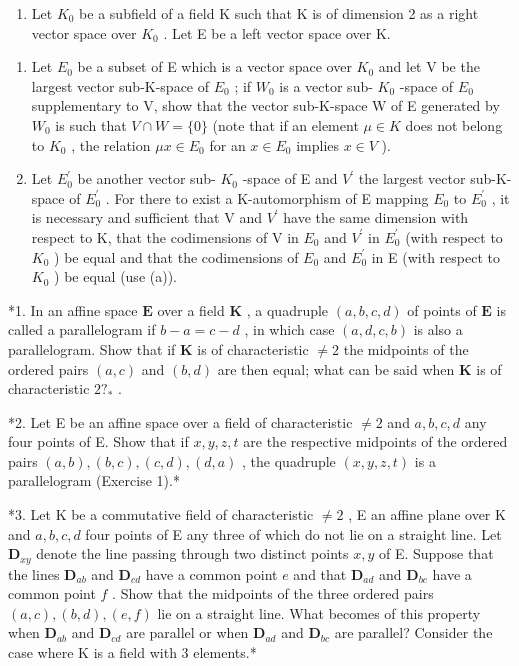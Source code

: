 \begin{enumerate}
\def\labelenumi{\arabic{enumi}.}
\setcounter{enumi}{4}
\tightlist
\item
  Let \(K_{0}\) be a subfield of a field K such that K is of dimension 2 as a right vector space over \(K_{0}\) . Let E be a left vector space over K.
\end{enumerate}

\begin{enumerate}
\def\labelenumi{(\alph{enumi})}
\item
  Let \(E_{0}\) be a subset of E which is a vector space over \(K_{0}\) and let V be the largest vector sub-K-space of \(E_{0}\) ; if \(W_{0}\) is a vector sub- \(K_{0}\) -space of \(E_{0}\) supplementary to V, show that the vector sub-K-space W of E generated by \(W_{0}\) is such that \(V \cap W = \{0\}\) (note that if an element \(\mu \in K\) does not belong to \(K_{0}\) , the relation \(\mu x \in E_{0}\) for an \(x \in E_{0}\) implies \(x \in V\) ).
\item
  Let \(E_{0}^{\prime}\) be another vector sub- \(K_{0}\) -space of E and \(V^{\prime}\) the largest vector sub-K-space of \(E_{0}^{\prime}\) . For there to exist a K-automorphism of E mapping \(E_{0}\) to \(E_{0}^{\prime}\) , it is necessary and sufficient that V and \(V^{\prime}\) have the same dimension with respect to K, that the codimensions of V in \(E_{0}\) and \(V^{\prime}\) in \(E_{0}^{\prime}\) (with respect to \(K_{0}\) ) be equal and that the codimensions of \(E_{0}\) and \(E_{0}^{\prime}\) in E (with respect to \(K_{0}\) ) be equal (use (a)).
\end{enumerate}

\BourbakiExercisesSection

*1. In an affine space \(\mathbf{E}\) over a field \(\mathbf{K}\) , a quadruple \((a, b, c, d)\) of points of \(\mathbf{E}\) is called a parallelogram if \(b - a = c - d\) , in which case \((a, d, c, b)\) is also a parallelogram. Show that if \(\mathbf{K}\) is of characteristic \(\neq 2\) the midpoints of the ordered pairs \((a, c)\) and \((b, d)\) are then equal; what can be said when \(\mathbf{K}\) is of characteristic \(2?_{*}\) .

*2. Let E be an affine space over a field of characteristic \(\neq 2\) and \(a, b, c, d\) any four points of E. Show that if \(x, y, z, t\) are the respective midpoints of the ordered pairs \((a, b), (b, c), (c, d), (d, a)\) , the quadruple \((x, y, z, t)\) is a parallelogram (Exercise 1).*

*3. Let K be a commutative field of characteristic \(\neq 2\) , E an affine plane over K and \(a, b, c, d\) four points of E any three of which do not lie on a straight line. Let \(\mathbf{D}_{xy}\) denote the line passing through two distinct points \(x, y\) of E. Suppose that the lines \(\mathbf{D}_{ab}\) and \(\mathbf{D}_{cd}\) have a common point \(e\) and that \(\mathbf{D}_{ad}\) and \(\mathbf{D}_{bc}\) have a common point \(f\) . Show that the midpoints of the three ordered pairs \((a, c), (b, d), (e, f)\) lie on a straight line. What becomes of this property when \(\mathbf{D}_{ab}\) and \(\mathbf{D}_{cd}\) are parallel or when \(\mathbf{D}_{ad}\) and \(\mathbf{D}_{bc}\) are parallel? Consider the case where K is a field with 3 elements.*

